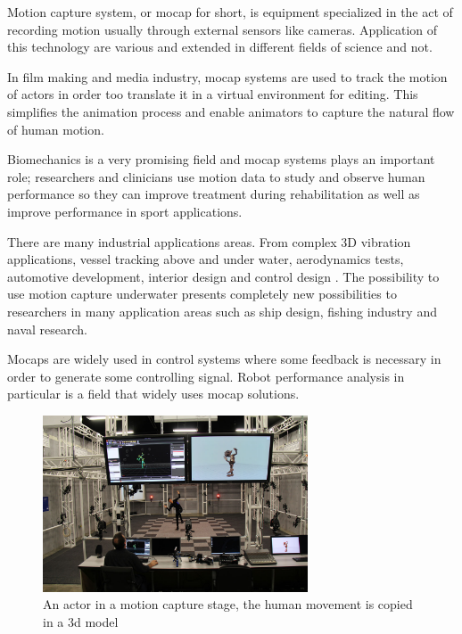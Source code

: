 Motion capture system, or mocap for short, is equipment specialized in the act of recording motion \cite{qualisys} usually through external sensors like cameras. Application of this technology are various and extended in different fields of science and not.\par In film making and media industry, mocap systems are used to track the motion of actors in order too translate it in a virtual environment for editing. This simplifies  the animation process and enable animators to capture the natural flow of human motion.\par Biomechanics is a very promising field and mocap systems plays an important role;  researchers and clinicians use motion data to study and observe human performance so they can improve treatment during rehabilitation as well as improve performance in sport applications. \par There are many industrial applications areas. From complex 3D vibration applications, vessel tracking above and under water, aerodynamics tests, automotive development, interior design and control design . The possibility to use motion capture underwater presents completely new possibilities to researchers in many application areas such as ship design, fishing industry and naval research.\par Mocaps are widely used in control systems where some feedback is necessary in order to generate some controlling signal. Robot performance analysis in particular is a field that widely uses mocap solutions.
\begin{figure}[h]
\centering
 \includegraphics[width=0.7\textwidth]{motionstage.jpg}
 \caption[Motion capture stage]{An actor in a motion capture stage, the human movement is copied in a 3d model}
 \label{figure:motionstage}
\end{figure}

